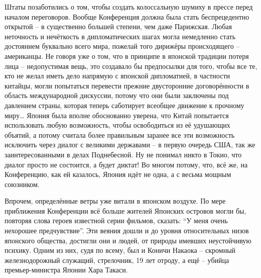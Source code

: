 Штаты позаботились о том, чтобы создать колоссальную шумиху в прессе перед началом переговоров. Вообще Конференция должна была стать беспрецедентно открытой – в существенно большей степени, чем даже Парижская. Любая неточность и нечёткость в дипломатических шагах могла немедленно стать достоянием буквально всего мира, пожелай того дирижёры происходящего – американцы. Не говоря уже о том, что в принципе в японской традиции потеря лица – недопустимая вещь, это создавало бы предпосылки для того, чтобы все те, кто не желал иметь дело напрямую с японской дипломатией, в частности китайцы, могли попытаться перевести прежние двусторонние договорённости в область международной дискуссии, потому что они были заключены под давлением страны, которая теперь саботирует всеобщее движение к прочному миру… Япония была вполне обоснованно уверена, что Китай попытается использовать любую возможность, чтобы освободиться из её удушающих объятий, а потому считала более правильным заранее все эти возможность исключить через диалог с великими державами – в первую очередь США, так же заинтересованными в делах Поднебесной. Ну не понимал никто в Токио, что диалог просто не состоится, а будет диктат! Во многом потому, что, всё же, на Конференцию, как ей казалось, Япония идёт не одна, а с весьма мощным союзником.

Впрочем, определённые ветры уже витали в японском воздухе. По мере приближения Конференции всё больше жителей Японских островов могли бы, повторяя слова героев известной серии фильмов, сказать: “У меня очень нехорошее предчувствие”. Эти веяния дошли и до уровня относительных низов японского общества, достигли они и людей, от природы имевших неустойчивую психику. Одним из них, судя по всему, был и Коничи Накаока – скромный железнодорожный служащий, стрелочник, 19 лет отроду, а ещё – убийца премьер-министра Японии Хара Такаси. 


